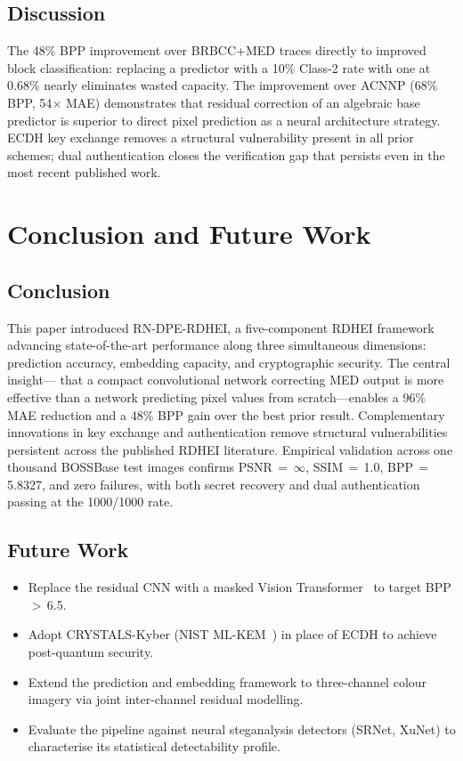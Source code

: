 \documentclass[runningheads]{llncs}
\begin{document}
\subsection{Discussion}
The 48\% BPP improvement over BRBCC+MED traces directly to
improved block classification: replacing a predictor with
a 10\% Class-2 rate with one at 0.68\% nearly eliminates
wasted capacity. The improvement over ACNNP (68\% BPP,
54$\times$ MAE) demonstrates that residual correction of an
algebraic base predictor is superior to direct pixel
prediction as a neural architecture strategy. ECDH key
exchange removes a structural vulnerability present in all
prior schemes; dual authentication closes the verification
gap that persists even in the most recent published work.

\section{Conclusion and Future Work}
\label{sec:conclusion}

\subsection{Conclusion}
This paper introduced RN-DPE-RDHEI, a five-component RDHEI
framework advancing state-of-the-art performance along three
simultaneous dimensions: prediction accuracy, embedding
capacity, and cryptographic security. The central insight---
that a compact convolutional network correcting MED output
is more effective than a network predicting pixel values from
scratch---enables a 96\% MAE reduction and a 48\% BPP gain
over the best prior result. Complementary innovations in key
exchange and authentication remove structural vulnerabilities
persistent across the published RDHEI literature. Empirical
validation across one thousand BOSSBase test images confirms
PSNR\,$=$\,$\infty$, SSIM\,$=$\,1.0, BPP\,$=$\,5.8327, and
zero failures, with both secret recovery and dual
authentication passing at the 1000/1000 rate.

\subsection{Future Work}
\begin{itemize}
\item Replace the residual CNN with a masked Vision
      Transformer~\cite{ref17} to target BPP\,$>$\,6.5.
\item Adopt CRYSTALS-Kyber (NIST ML-KEM~\cite{ref15}) in
      place of ECDH to achieve post-quantum security.
\item Extend the prediction and embedding framework to
      three-channel colour imagery via joint inter-channel
      residual modelling.
\item Evaluate the pipeline against neural steganalysis
      detectors (SRNet, XuNet) to characterise its
      statistical detectability profile.
\end{itemize}
\end{document}
